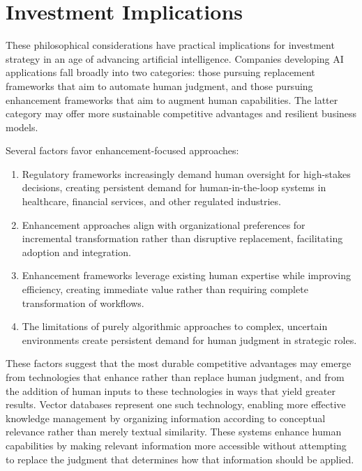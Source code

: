 \documentclass[
  Letterpaper,
]{scrbook}
\begin{document}
\section{Investment Implications}\label{investment-implications-2}

These philosophical considerations have practical implications for
investment strategy in an age of
advancing artificial intelligence. Companies developing AI applications
fall broadly into two categories: those pursuing replacement frameworks
that aim to automate human judgment, and those pursuing enhancement
frameworks that aim to augment human capabilities. The latter category
may offer more sustainable competitive advantages and resilient business
models.

Several factors favor enhancement-focused approaches:

\begin{enumerate}
\def\labelenumi{\arabic{enumi}.}
\item
  Regulatory frameworks increasingly
  demand human oversight for high-stakes decisions, creating persistent
  demand for human-in-the-loop
  systems in healthcare, financial services,
  and other regulated industries.
\item
  Enhancement approaches align with organizational preferences for
  incremental transformation rather than disruptive replacement,
  facilitating adoption and integration.
\item
  Enhancement frameworks leverage existing human expertise while
  improving efficiency, creating immediate value rather than requiring
  complete transformation of workflows.
\item
  The limitations of purely algorithmic approaches to complex, uncertain
  environments create persistent demand for human judgment in strategic
  roles.
\end{enumerate}

These factors suggest that the most durable competitive advantages may
emerge from technologies that enhance rather than replace human
judgment, and from the addition of human inputs to these technologies in
ways that yield greater results. Vector
databases represent one such
technology, enabling more effective knowledge management by organizing
information according to conceptual relevance rather than merely textual
similarity. These systems enhance human capabilities by making relevant
information more accessible without attempting to replace the judgment
that determines how that information should be applied.
\end{document}
